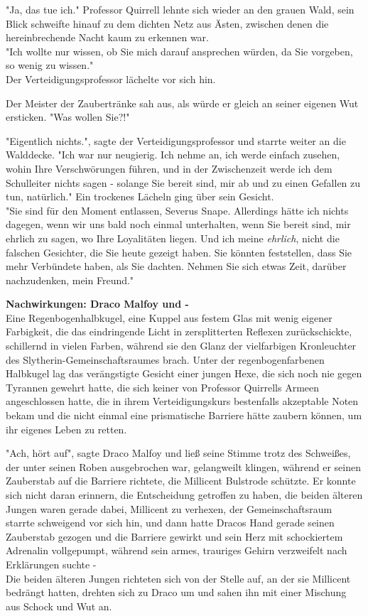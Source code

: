 {"Ja, das tue ich." Professor Quirrell lehnte sich wieder an den grauen Wald, sein Blick schweifte hinauf zu dem dichten Netz aus Ästen, zwischen denen die hereinbrechende Nacht kaum zu erkennen war.\\ "Ich wollte nur wissen, ob Sie mich darauf ansprechen würden, da Sie vorgeben, so wenig zu wissen."\\ Der Verteidigungsprofessor lächelte vor sich hin.

Der Meister der Zaubertränke sah aus, als würde er gleich an seiner eigenen Wut ersticken. "Was wollen Sie?!"

"Eigentlich nichts.", sagte der Verteidigungsprofessor und starrte weiter an die Walddecke. "Ich war nur neugierig. Ich nehme an, ich werde einfach zusehen, wohin Ihre Verschwörungen führen, und in der Zwischenzeit werde ich dem Schulleiter nichts sagen - solange Sie bereit sind, mir ab und zu einen Gefallen zu tun, natürlich." Ein trockenes Lächeln ging über sein Gesicht.\\ "Sie sind für den Moment entlassen, Severus Snape. Allerdings hätte ich nichts dagegen, wenn wir uns bald noch einmal unterhalten, wenn Sie bereit sind, mir ehrlich zu sagen, wo Ihre Loyalitäten liegen. Und ich meine \emph{ehrlich}, nicht die falschen Gesichter, die Sie heute gezeigt haben. Sie könnten feststellen, dass Sie mehr Verbündete haben, als Sie dachten. Nehmen Sie sich etwas Zeit, darüber nachzudenken, mein Freund."

\textbf{Nachwirkungen: Draco Malfoy und -}\\ Eine Regenbogenhalbkugel, eine Kuppel aus festem Glas mit wenig eigener Farbigkeit, die das eindringende Licht in zersplitterten Reflexen zurückschickte, schillernd in vielen Farben, während sie den Glanz der vielfarbigen Kronleuchter des Slytherin-Gemeinschaftsraumes brach. Unter der regenbogenfarbenen Halbkugel lag das verängstigte Gesicht einer jungen Hexe, die sich noch nie gegen Tyrannen gewehrt hatte, die sich keiner von Professor Quirrells Armeen angeschlossen hatte, die in ihrem Verteidigungskurs bestenfalls akzeptable Noten bekam und die nicht einmal eine prismatische Barriere hätte zaubern können, um ihr eigenes Leben zu retten.

"Ach, hört auf", sagte Draco Malfoy und ließ seine Stimme trotz des Schweißes, der unter seinen Roben ausgebrochen war, gelangweilt klingen, während er seinen Zauberstab auf die Barriere richtete, die Millicent Bulstrode schützte. Er konnte sich nicht daran erinnern, die Entscheidung getroffen zu haben, die beiden älteren Jungen waren gerade dabei, Millicent zu verhexen, der Gemeinschaftsraum starrte schweigend vor sich hin, und dann hatte Dracos Hand gerade seinen Zauberstab gezogen und die Barriere gewirkt und sein Herz mit schockiertem Adrenalin vollgepumpt, während sein armes, trauriges Gehirn verzweifelt nach Erklärungen suchte -\\ Die beiden älteren Jungen richteten sich von der Stelle auf, an der sie Millicent bedrängt hatten, drehten sich zu Draco um und sahen ihn mit einer Mischung aus Schock und Wut an.

}
